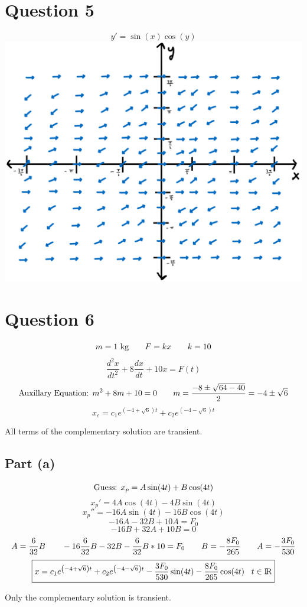 \documentclass{article}
\begin{document}
\section*{Question 5}
\begin{center}
\[y'=\sin(x)\cos(y)\]
\includegraphics[scale=0.5]{question2.png}
\end{center}
\section*{Question 6}
\[m=1 \textnormal{ kg}\hspace{7 mm}F=kx\hspace{7 mm}k=10\]
\[\frac{d^2x}{dt^2}+8\frac{dx}{dt}+10x=F(t)\]
\[\textnormal{Auxillary Equation: }m^2+8m+10=0\hspace{7 mm}m=\frac{-8\pm\sqrt{64-40}}{2}=-4\pm\sqrt{6}\]
\[x_c=c_1e^{\left(-4+\sqrt{6}\right)t}+c_2e^{\left(-4-\sqrt{6}\right)t}\]
\begin{center}
All terms of the complementary solution are transient.
\end{center}
\subsection*{Part (a)}
\[\textnormal{Guess: }x_p=A\sin(4t)+B\cos(4t)\]
\[x_p'=4A\cos(4t)-4B\sin(4t)\]
\[x_p''=-16A\sin(4t)-16B\cos(4t)\]
\[-16A-32B+10A=F_0\]
\[-16B+32A+10B=0\]
\[A=\frac{6}{32}B\hspace{7 mm}-16\frac{6}{32}B-32B-\frac{6}{32}B*10=F_0\hspace{7 mm}B=-\frac{8F_0}{265}\hspace{7 mm}A=-\frac{3F_0}{530}\]
\[\boxed{x=c_1e^{\left(-4+\sqrt{6}\right)t}+c_2e^{\left(-4-\sqrt{6}\right)t}-\frac{3F_0}{530}\sin(4t)-\frac{8F_0}{265}\cos(4t)\hspace{3 mm}t\in{\rm I\!R}}\]
\begin{center}
Only the complementary solution is transient.
\end{center}
\end{document}
